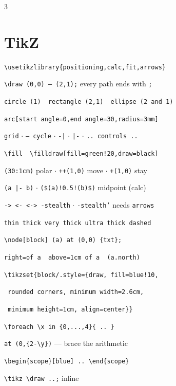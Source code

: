 \documentclass[a4paper]{article}
\newcommand{\C}[1]{\texttt{\footnotesize #1}}
\begin{document}
{\begin{multicols}{3}
\section{TikZ}
\C{\textbackslash usetikzlibrary\{positioning,calc,fit,arrows\}}\par
\C{\textbackslash draw (0,0) -- (2,1);} every path ends with \C{;}\par
\C{circle (1) \ rectangle (2,1) \ ellipse (2 and 1)}\par
\C{arc[start angle=0,end angle=30,radius=3mm]}\par
\C{grid} $\cdot$ \C{-- cycle} $\cdot$ \C{-|} $\cdot$ \C{|-} $\cdot$ \C{.. controls ..}\par
\C{\textbackslash fill \ \textbackslash filldraw[fill=green!20,draw=black]}\par
\C{(30:1cm)} polar $\cdot$ \C{++(1,0)} move $\cdot$ \C{+(1,0)} stay\par
\C{(a |- b)} $\cdot$ \C{(\$(a)!0.5!(b)\$)} midpoint (calc)\par
\C{-> <- <-> -stealth} $\cdot$ \C{-stealth'} needs \C{arrows}\par
\C{thin thick very thick ultra thick dashed}\par
\C{\textbackslash node[block] (a) at (0,0) \{txt\};}\par
\C{right=of a \ above=1cm of a \ (a.north)}\par
\C{\textbackslash tikzset\{block/.style=\{draw, fill=blue!10,}\par
\C{ rounded corners, minimum width=2.6cm,}\par
\C{ minimum height=1cm, align=center\}\}}\par
\C{\textbackslash foreach \textbackslash x in \{0,...,4\}\{ .. \}}\par
\C{at (0,\{2-\textbackslash y\})} --- brace the arithmetic\par
\C{\textbackslash begin\{scope\}[blue] .. \textbackslash end\{scope\}}\par
\C{\textbackslash tikz \textbackslash draw ..;} inline


\end{multicols}}
\end{document}
